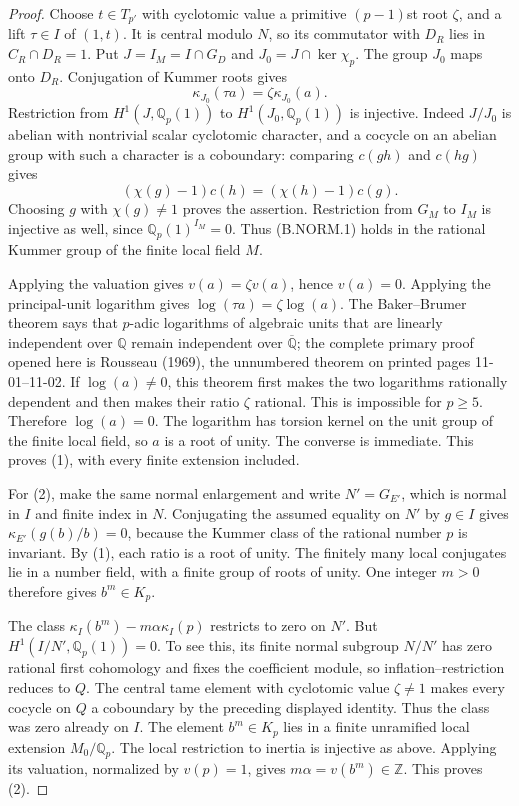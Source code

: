 \begin{proof}
Choose $t\in T_{p'}$ with cyclotomic value a primitive
$(p-1)$st root $\zeta$, and a lift $\tau\in I$ of $(1,t)$.
It is central modulo $N$, so its commutator with $D_R$ lies in
$C_R\cap D_R=1$.  Put $J=I_M=I\cap G_D$ and
$J_0=J\cap\ker\chi_p$.  The group $J_0$ maps onto $D_R$.
Conjugation of Kummer roots gives
\[
 \kappa_{J_0}(\tau a)=\zeta\kappa_{J_0}(a).                 \tag{B.NORM.1}
\]
Restriction from $H^1(J,\mathbb Q_p(1))$ to
$H^1(J_0,\mathbb Q_p(1))$ is injective.  Indeed $J/J_0$ is
abelian with nontrivial scalar cyclotomic character, and a cocycle
on an abelian group with such a character is a coboundary: comparing
$c(gh)$ and $c(hg)$ gives
\[
 (\chi(g)-1)c(h)=(\chi(h)-1)c(g).
\]
Choosing $g$ with $\chi(g)\ne1$ proves the assertion.
Restriction from $G_M$ to $I_M$ is injective as well, since
$\mathbb Q_p(1)^{I_M}=0$.  Thus (B.NORM.1) holds in the rational
Kummer group of the finite local field $M$.

Applying the valuation gives $v(a)=\zeta v(a)$, hence $v(a)=0$.
Applying the principal-unit logarithm gives
$\log(\tau a)=\zeta\log(a)$.  The Baker--Brumer theorem says
that $p$-adic logarithms of algebraic units that are linearly
independent over $\mathbb Q$ remain independent over
$\overline{\mathbb Q}$; the complete primary proof opened here
is Rousseau (1969), the unnumbered theorem on printed pages
11-01--11-02.  If $\log(a)\ne0$, this theorem first makes the two
logarithms rationally dependent and then makes their ratio
$\zeta$ rational.  This is impossible for $p\geq5$.
Therefore $\log(a)=0$.  The logarithm has torsion kernel on the
unit group of the finite local field, so $a$ is a root of unity.
The converse is immediate.  This proves (1), with every finite
extension included.

For (2), make the same normal enlargement and write $N'=G_{E'}$,
which is normal in $I$ and finite index in $N$.  Conjugating the
assumed equality on $N'$ by $g\in I$ gives
$\kappa_{E'}(g(b)/b)=0$, because the Kummer class of the rational
number $p$ is invariant.  By (1), each ratio is a root of unity.
The finitely many local conjugates lie in a number field, with a
finite group of roots of unity.  One integer $m>0$ therefore gives
$b^m\in K_p$.

The class $\kappa_I(b^m)-m\alpha\kappa_I(p)$ restricts to zero
on $N'$.  But
$H^1(I/N',\mathbb Q_p(1))=0$.  To see this, its finite normal
subgroup $N/N'$ has zero rational first cohomology and fixes the
coefficient module, so inflation--restriction reduces to $Q$.
The central tame element with cyclotomic value $\zeta\ne1$ makes
every cocycle on $Q$ a coboundary by the preceding displayed identity.
Thus the class was zero already on $I$.  The element $b^m\in K_p$
lies in a finite unramified local extension $M_0/\mathbb Q_p$.
The local restriction to inertia is injective as above.  Applying
its valuation, normalized by $v(p)=1$, gives
$m\alpha=v(b^m)\in\mathbb Z$.  This proves (2).


\end{proof}
